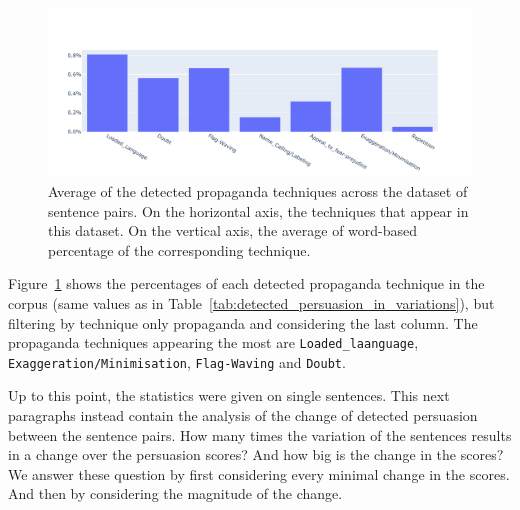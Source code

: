 \begin{figure}[!htbp]
    \centering
    \includegraphics[width=\linewidth]{figures/4.3.1_propaganda_avg.pdf}
    \caption{Average of the detected propaganda techniques across the dataset of sentence pairs. On the horizontal axis, the techniques that appear in this dataset. On the vertical axis, the average of word-based percentage of the corresponding technique.}
    \label{fig:propaganda_avg}
\end{figure}

Figure~\ref{fig:propaganda_avg} shows the percentages of each detected propaganda technique in the corpus (same values as in Table~\ref{tab:detected_persuasion_in_variations}), but filtering by technique only propaganda and considering the last column.
The propaganda techniques appearing the most are \texttt{Loaded\_laanguage}, \texttt{Exaggeration/Minimisation}, \texttt{Flag-Waving} and \texttt{Doubt}.

Up to this point, the statistics were given on single sentences. This next paragraphs instead contain the analysis of the change of detected persuasion between the sentence pairs.
How many times the variation of the sentences results in a change over the persuasion scores? And how big is the change in the scores?
We answer these question by first considering every minimal change in the scores. And then by considering the magnitude of the change.


